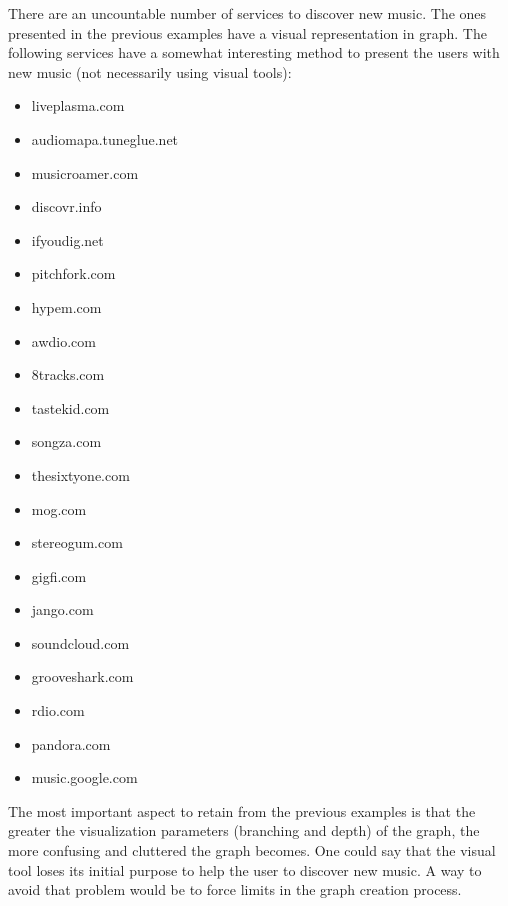   There are an uncountable number of services to discover new music.
  The ones presented in the previous examples have a visual representation in graph.
  The following services have a somewhat interesting method to present the users with new music (not necessarily using visual tools):


  \begin{itemize}
    \item liveplasma.com
    \item audiomapa.tuneglue.net
    \item musicroamer.com
    \item discovr.info
    \item ifyoudig.net
    \item pitchfork.com
    \item hypem.com
    \item awdio.com
    \item 8tracks.com
    \item tastekid.com
    \item songza.com
    \item thesixtyone.com
    \item mog.com
    \item stereogum.com
    \item gigfi.com
    \item jango.com
    \item soundcloud.com
    \item grooveshark.com
    \item rdio.com
    \item pandora.com
    \item music.google.com
  \end{itemize}


  The most important aspect to retain from the previous examples is that the greater the visualization parameters (branching and depth) of the graph, the more confusing and cluttered the graph becomes.
  One could say that the visual tool loses its initial purpose to help the user to discover new music.
  A way to avoid that problem would be to force limits in the graph creation process.
